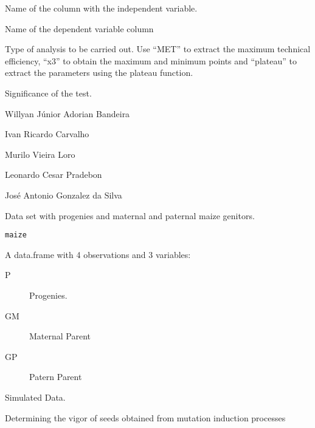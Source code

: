\documentclass[a4paper]{book}
\begin{document}
%
\begin{Arguments}
\begin{ldescription}
\item[\code{indep}] Name of the column with the independent variable.

\item[\code{dep}] Name of the dependent variable column

\item[\code{type}] Type of analysis to be carried out. Use “MET” to extract the
maximum technical efficiency, “x3” to obtain the maximum and minimum points
and “plateau” to extract the parameters using the plateau function.

\item[\code{alpha}] Significance of the test.
\end{ldescription}
\end{Arguments}
%
\begin{Author}
Willyan Júnior Adorian Bandeira

Ivan Ricardo Carvalho

Murilo Vieira Loro

Leonardo Cesar Pradebon

José Antonio Gonzalez da Silva
\end{Author}
%
\begin{Description}
Data set with progenies and maternal and paternal maize genitors.
\end{Description}
%
\begin{Usage}
\begin{verbatim}
maize
\end{verbatim}
\end{Usage}
%
\begin{Format}
A data.frame with 4 observations and 3 variables:
\begin{description}

\item[P] Progenies.
\item[GM] Maternal Parent
\item[GP] Patern Parent

\end{description}

\end{Format}
%
\begin{Source}
Simulated Data.
\end{Source}
%
\begin{Description}
Determining the vigor of seeds obtained from mutation induction processes
\end{Description}
\end{document}
